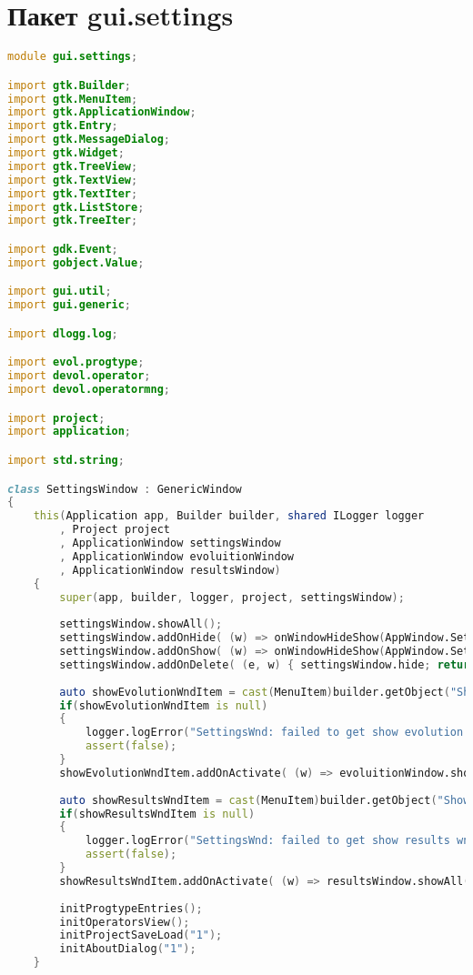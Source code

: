 \documentclass[russian,utf8,emptystyle]{eskdtext}
\begin{document}
\section{Пакет gui.settings}
\begin{lstlisting}[language=D]
module gui.settings;

import gtk.Builder;
import gtk.MenuItem;
import gtk.ApplicationWindow;
import gtk.Entry;
import gtk.MessageDialog;
import gtk.Widget;
import gtk.TreeView;
import gtk.TextView;
import gtk.TextIter;
import gtk.ListStore;
import gtk.TreeIter;

import gdk.Event;
import gobject.Value;

import gui.util;
import gui.generic;

import dlogg.log;

import evol.progtype;
import devol.operator;
import devol.operatormng;

import project;
import application;

import std.string;

class SettingsWindow : GenericWindow
{   
    this(Application app, Builder builder, shared ILogger logger
        , Project project
        , ApplicationWindow settingsWindow
        , ApplicationWindow evoluitionWindow
        , ApplicationWindow resultsWindow)
    {
        super(app, builder, logger, project, settingsWindow);
        
        settingsWindow.showAll();
        settingsWindow.addOnHide( (w) => onWindowHideShow(AppWindow.Settings, true) );
        settingsWindow.addOnShow( (w) => onWindowHideShow(AppWindow.Settings, false) );
        settingsWindow.addOnDelete( (e, w) { settingsWindow.hide; return true; } );
        
        auto showEvolutionWndItem = cast(MenuItem)builder.getObject("ShowEvolutionWndItem1");
        if(showEvolutionWndItem is null)
        {
            logger.logError("SettingsWnd: failed to get show evolution wnd item!");
            assert(false);
        }
        showEvolutionWndItem.addOnActivate( (w) => evoluitionWindow.showAll() );
        
        auto showResultsWndItem = cast(MenuItem)builder.getObject("ShowResultsWndItem1");
        if(showResultsWndItem is null)
        {
            logger.logError("SettingsWnd: failed to get show results wnd item!");
            assert(false);
        }
        showResultsWndItem.addOnActivate( (w) => resultsWindow.showAll() );
        
        initProgtypeEntries();
        initOperatorsView();
        initProjectSaveLoad("1");
        initAboutDialog("1");
    }
    

\end{lstlisting}
\end{document}
